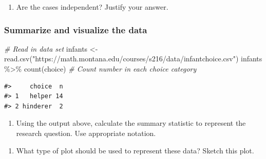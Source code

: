 \documentclass[
]{report}
\newenvironment{Shaded}{\begin{snugshade}}{\end{snugshade}}
\newcommand{\CommentTok}[1]{\textcolor[rgb]{0.56,0.35,0.01}{\textit{#1}}}
\newcommand{\FunctionTok}[1]{\textcolor[rgb]{0.00,0.00,0.00}{#1}}
\newcommand{\NormalTok}[1]{#1}
\newcommand{\OtherTok}[1]{\textcolor[rgb]{0.56,0.35,0.01}{#1}}
\newcommand{\SpecialCharTok}[1]{\textcolor[rgb]{0.00,0.00,0.00}{#1}}
\newcommand{\StringTok}[1]{\textcolor[rgb]{0.31,0.60,0.02}{#1}}
\providecommand{\tightlist}{%
  \setlength{\itemsep}{0pt}\setlength{\parskip}{0pt}}
\begin{document}
\begin{enumerate}
\def\labelenumi{\arabic{enumi}.}
\setcounter{enumi}{3}
\tightlist
\item
  Are the cases independent? Justify your answer.
\end{enumerate}

\vspace{0.8in}

\newpage

\hypertarget{summarize-and-visualize-the-data}{%
\subsubsection*{Summarize and visualize the data}\label{summarize-and-visualize-the-data}}

\begin{Shaded}
\begin{Highlighting}[]
 \CommentTok{\# Read in data set}
\NormalTok{infants }\OtherTok{\textless{}{-}} \FunctionTok{read.csv}\NormalTok{(}\StringTok{"https://math.montana.edu/courses/s216/data/infantchoice.csv"}\NormalTok{)}
\NormalTok{infants }\SpecialCharTok{\%\textgreater{}\%} \FunctionTok{count}\NormalTok{(choice)  }\CommentTok{\# Count number in each choice category}
\end{Highlighting}
\end{Shaded}

\begin{verbatim}
#>     choice  n
#> 1   helper 14
#> 2 hinderer  2
\end{verbatim}

\begin{enumerate}
\def\labelenumi{\arabic{enumi}.}
\setcounter{enumi}{4}
\tightlist
\item
  Using the output above, calculate the summary statistic to represent the research question. Use appropriate notation.
\end{enumerate}

\vspace{0.5in}

\begin{enumerate}
\def\labelenumi{\arabic{enumi}.}
\setcounter{enumi}{5}
\tightlist
\item
  What type of plot should be used to represent these data? Sketch this plot.
\end{enumerate}

\vspace{1.5in}
\end{document}
